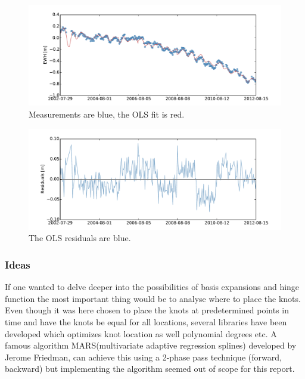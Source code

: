 \begin{figure}[H]
	\centering
	\includegraphics[width=\textwidth]{figures/splines-selected-1-fit}
	\caption{Measurements are blue, the OLS fit is red.}
	\label{fig:splines-selected-1-fit}
\end{figure}

\begin{figure}[H]
	\centering
	\includegraphics[width=\textwidth]{figures/splines-selected-1-residual}
	\caption{The OLS residuals are blue.}
	\label{fig:splines-selected-1-residual}
\end{figure}

\subsubsection{Ideas}
If one wanted to delve deeper into the possibilities of basis expansions and hinge function the most important thing would be to analyse where to place the knots. Even though it was here chosen to place the knots at predetermined points in time and have the knots be equal for all locations, several libraries have been developed which optimizes knot location as well polynomial degrees etc.
 A famous algorithm MARS\textregistered (multivariate adaptive regression splines) developed by Jerome Friedman, can achieve this using a 2-phase pass technique \cite{wiki-MARS} (forward, backward) but implementing the algorithm seemed out of scope for this report.
